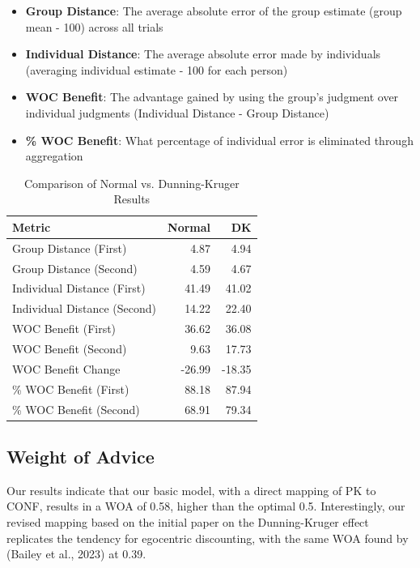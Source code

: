 \documentclass[
  man,floatsintext]{apa6}
\providecommand{\tightlist}{%
  \setlength{\itemsep}{0pt}\setlength{\parskip}{0pt}}
\begin{document}
\begin{itemize}
\tightlist
\item
  \textbf{Group Distance}: The average absolute error of the group estimate (\textbar group mean - 100\textbar) across all trials
\item
  \textbf{Individual Distance}: The average absolute error made by individuals (averaging \textbar individual estimate - 100\textbar{} for each person)
\item
  \textbf{WOC Benefit}: The advantage gained by using the group's judgment over individual judgments (Individual Distance - Group Distance)
\item
  \textbf{\% WOC Benefit}: What percentage of individual error is eliminated through aggregation
\end{itemize}

\begin{table}

\caption{\label{tab:comparison-table}Comparison of Normal vs. Dunning-Kruger Results}
\centering
\begin{tabular}[t]{lrr}
\toprule
Metric & Normal & DK\\
\midrule
Group Distance (First) & 4.87 & 4.94\\
Group Distance (Second) & 4.59 & 4.67\\
Individual Distance (First) & 41.49 & 41.02\\
Individual Distance (Second) & 14.22 & 22.40\\
WOC Benefit (First) & 36.62 & 36.08\\
\addlinespace
WOC Benefit (Second) & 9.63 & 17.73\\
WOC Benefit Change & -26.99 & -18.35\\
\% WOC Benefit (First) & 88.18 & 87.94\\
\% WOC Benefit (Second) & 68.91 & 79.34\\
\bottomrule
\end{tabular}
\end{table}

\hypertarget{weight-of-advice-1}{%
\subsection{Weight of Advice}\label{weight-of-advice-1}}

Our results indicate that our basic model, with a direct mapping of PK to CONF, results in a WOA of 0.58, higher than the optimal 0.5. Interestingly, our revised mapping based on the initial paper on the Dunning-Kruger effect replicates the tendency for egocentric discounting, with the same WOA found by (Bailey et al., 2023) at 0.39.
\end{document}
